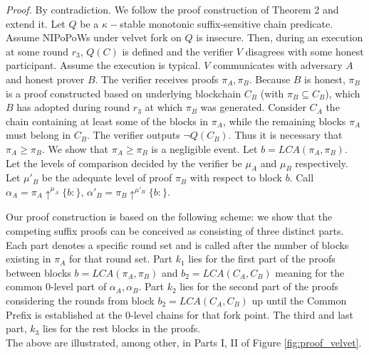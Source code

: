 \textit{Proof.} By contradiction. We follow the proof construction of Theorem 2 and extend it. Let $Q$ be a $\kappa-$stable monotonic suffix-sensitive chain predicate. Assume NIPoPoWs under velvet fork on $Q$ is insecure. Then, during an execution at some round  $r_3$, $Q(C)$ is defined and the verifier $V$ disagrees with some honest participant. Assume the execution is typical. $V$ communicates with adversary $A$ and honest prover $B$. The verifier receives proofs $\pi_A, \pi_B$. Because $B$ is honest, $\pi_B$ is a proof constructed based on underlying blockchain $C_B$ (with $\pi_B \subseteq C_B$), which $B$ has adopted during round $r_3$ at which $\pi_B$ was generated. Consider $C_A$ the chain containing at least some of the blocks in $\pi_A$, while the remaining blocks $\pi_A$ must belong in $C_B$. 
The verifier outputs $\neg Q(C_B)$. Thus it is necessary that $\pi_A \geq \pi_B$. We show that $\pi_A \geq \pi_B$ is a negligible event. 
Let $b = LCA(\pi_A, \pi_B)$. Let the levels of comparison decided by the verifier be $\mu_A$ and $\mu_B$ respectively. Let $\mu'_B$ be the adequate level of proof $\pi_B$  with respect to block $b$. Call $\alpha_A = \pi_A \uparrow^{\mu_A}\{b:\}$, 
$\alpha'_B = \pi_B \uparrow^{\mu'_B}\{b:\}$.

Our proof construction is based on the following scheme: we show that the competing suffix proofs can be conceived as consisting of three distinct parts. Each part denotes a specific round set and is called after the number of blocks existing in $\pi_A$ for that round set. Part $k_1$ lies for the first part of the proofs between blocks $b = LCA(\pi_A, \pi_B)$ and $b_2 = LCA(C_A, C_B)$ meaning for the common 0-level part of $\alpha_A,  \alpha_B$. Part $k_2$ lies for the second part of the proofs considering the rounds from block $b_2 = LCA(C_A, C_B)$ up until the Common Prefix is established at the 0-level chains for that fork point. The third and last part, $k_3$ lies for the rest blocks in the proofs.\\
The above are illustrated, among other, in Parts I, II of Figure \ref{fig:proof_velvet}.

